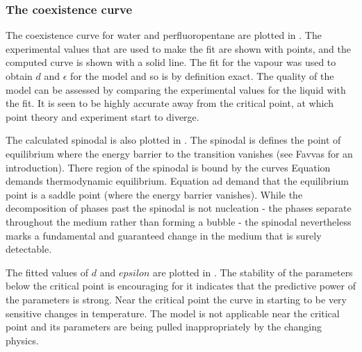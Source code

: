 \subsubsection{The coexistence curve}

The coexistence curve for water and perfluoropentane are plotted in .
The experimental values that are used to make the fit are shown with points,
and the computed curve is shown with a solid line.  
The fit for the vapour was  used to obtain $d$ and $\epsilon$ for the model and so is by definition exact.
The quality of the model can be assessed by comparing the experimental values for the liquid with the fit.
It is seen to be highly accurate away from the critical point, 
at which point theory and experiment start to diverge.


The calculated spinodal is also plotted in .
The spinodal is defines the point of equilibrium where the energy barrier to the transition vanishes (see Favvas\cite{Favvas2008} for an introduction).
There region of the spinodal is bound by the curves
Equation   demands thermodynamic equilibrium.
Equation   ad    demand that the equilibrium point is a saddle point (where the energy barrier vanishes).
%
While the decomposition of phases past the spinodal is not  nucleation -
the phases separate throughout the medium rather than forming a bubble -
the spinodal nevertheless marks a fundamental and guaranteed  change in the medium that is surely detectable.

The fitted values of $d$ and $epsilon$ are plotted in .
The stability of the parameters below the critical point is encouraging
for it indicates that the predictive power of the parameters is strong.
Near the critical point the curve in 
starting to be very sensitive changes in temperature.
The model is not applicable near the critical point 
and its parameters are being pulled inappropriately by the changing 
physics.


